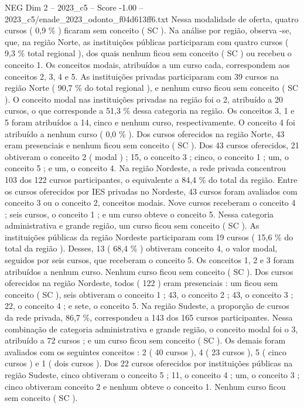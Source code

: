 \begin{textsample}{NEG Dim 2 – 2023\_c5 – Score -1.00 – 2023\_c5/enade\_2023\_odonto\_f04d613ff6.txt}
Nessa modalidade de oferta, quatro cursos ( 0,9 \% ) ficaram sem conceito ( SC ).
Na análise por região, observa -se, que, na região Norte, as instituições públicas participaram com quatro cursos ( 9,3 \% total regional ), dos quais nenhum ficou sem conceito ( SC ) ou recebeu o conceito 1.
Os conceitos modais, atribuídos a um curso cada, correspondem aos conceitos 2, 3, 4 e 5.
As instituições privadas participaram com 39 cursos na região Norte ( 90,7 \% do total regional ), e nenhum curso ficou sem conceito ( SC ).
O conceito modal nas instituições privadas na região foi o 2, atribuído a 20 cursos, o que corresponde a 51,3 \% dessa categoria na região.
Os conceitos 3, 1 e 5 foram atribuídos a 14, cinco e nenhum curso, respectivamente.
O conceito 4 foi atribuído a nenhum curso ( 0,0 \% ).
Dos cursos oferecidos na região Norte, 43 eram presenciais e nenhum ficou sem conceito ( SC ).
Dos 43 cursos oferecidos, 21 obtiveram o conceito 2 ( modal ) ; 15, o conceito 3 ; cinco, o conceito 1 ; um, o conceito 5 ; e um, o conceito 4.
Na região Nordeste, a rede privada concentrou 103 dos 122 cursos participantes, o equivalente a 84,4 \% do total da região.
Entre os cursos oferecidos por IES privadas no Nordeste, 43 cursos foram avaliados com conceito 3 ou o conceito 2, conceitos modais.
Nove cursos receberam o conceito 4 ; seis cursos, o conceito 1 ; e um curso obteve o conceito 5.
Nessa categoria administrativa e grande região, um curso ficou sem conceito ( SC ).
As instituições públicas da região Nordeste participaram com 19 cursos ( 15,6 \% do total da região ).
Desses, 13 ( 68,4 \% ) obtiveram conceito 4, o valor modal, seguidos por seis cursos, que receberam o conceito 5.
Os conceitos 1, 2 e 3 foram atribuídos a nenhum curso.
Nenhum curso ficou sem conceito ( SC ).
Dos cursos oferecidos na região Nordeste, todos ( 122 ) eram presenciais : um ficou sem conceito ( SC ), seis obtiveram o conceito 1 ; 43, o conceito 2 ; 43, o conceito 3 ; 22, o conceito 4 ; e sete, o conceito 5.
Na região Sudeste, a proporção de cursos da rede privada, 86,7 \%, correspondeu a 143 dos 165 cursos participantes.
Nessa combinação de categoria administrativa e grande região, o conceito modal foi o 3, atribuído a 72 cursos ; e um curso ficou sem conceito ( SC ).
Os demais foram avaliados com os seguintes conceitos : 2 ( 40 cursos ), 4 ( 23 cursos ), 5 ( cinco cursos ) e 1 ( dois cursos ).
Dos 22 cursos oferecidos por instituições públicas na região Sudeste, cinco obtiveram o conceito 5 ; 11, o conceito 4 ; um, o conceito 3 ; cinco obtiveram conceito 2 e nenhum obteve o conceito 1.
Nenhum curso ficou sem conceito ( SC ).

\end{textsample}
